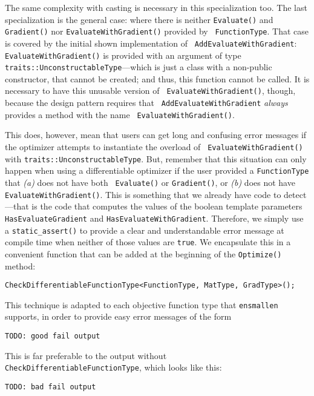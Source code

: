 The same complexity with casting is necessary in this specialization too.  The
last specialization is the general case: where there is neither {\tt Evaluate()}
and {\tt Gradient()} nor {\tt EvaluateWithGradient()} provided by {\tt
FunctionType}.  That case is covered by the initial shown implementation of {\tt
AddEvaluateWithGradient}: {\tt EvaluateWithGradient()} is provided with an
argument of type {\tt traits::UnconstructableType}---which is just a class with
a non-public constructor, that cannot be created; and thus, this function cannot
be called.  It is necessary to have this unusable version of {\tt
EvaluateWithGradient()}, though, because the design pattern requires that {\tt
AddEvaluateWithGradient} {\em always} provides a method with the name {\tt
EvaluateWithGradient()}.

This does, however, mean that users can get long and confusing error messages if
the optimizer attempts to instantiate the overload of {\tt
EvaluateWithGradient()} with {\tt traits::UnconstructableType}.  But, remember
that this situation can only happen when using a differentiable optimizer if
the user provided a {\tt FunctionType} that {\it (a)} does not have both {\tt
Evaluate()} or {\tt Gradient()}, or {\it (b)} does not have {\tt
EvaluateWithGradient()}.  This is something that we already have code to
detect---that is the code that computes the values of the boolean template
parameters {\tt HasEvaluateGradient} and {\tt HasEvaluateWithGradient}.
Therefore, we simply use a {\tt static\_assert()} to provide a clear and
understandable error message at compile time when neither of those values are
{\tt true}.  We encapsulate this in a convenient function that can be added at
the beginning of the {\tt Optimize()} method:

\begin{verbatim}
CheckDifferentiableFunctionType<FunctionType, MatType, GradType>();
\end{verbatim}

This technique is adapted to each objective function type that {\tt ensmallen}
supports, in order to provide easy error messages of the form

\begin{verbatim}
TODO: good fail output
\end{verbatim}

This is far preferable to the output without {\tt
CheckDifferentiableFunctionType}, which looks like this:

\begin{verbatim}
TODO: bad fail output
\end{verbatim}


